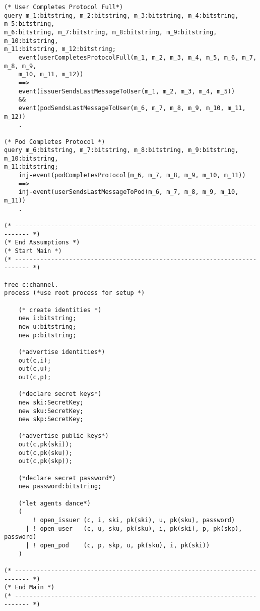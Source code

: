 \begin{Verbatim}[fontsize=\small]
(* User Completes Protocol Full*)
query m_1:bitstring, m_2:bitstring, m_3:bitstring, m_4:bitstring, m_5:bitstring, 
m_6:bitstring, m_7:bitstring, m_8:bitstring, m_9:bitstring, m_10:bitstring,
m_11:bitstring, m_12:bitstring; 
    event(userCompletesProtocolFull(m_1, m_2, m_3, m_4, m_5, m_6, m_7, m_8, m_9, 
    m_10, m_11, m_12))
    ==>
    event(issuerSendsLastMessageToUser(m_1, m_2, m_3, m_4, m_5))
    &&
    event(podSendsLastMessageToUser(m_6, m_7, m_8, m_9, m_10, m_11, m_12))
    .

(* Pod Completes Protocol *)
query m_6:bitstring, m_7:bitstring, m_8:bitstring, m_9:bitstring, m_10:bitstring, 
m_11:bitstring; 
    inj-event(podCompletesProtocol(m_6, m_7, m_8, m_9, m_10, m_11))
    ==>
    inj-event(userSendsLastMessageToPod(m_6, m_7, m_8, m_9, m_10, m_11))
    .

(* -------------------------------------------------------------------------- *)
(* End Assumptions *)
(* Start Main *)
(* -------------------------------------------------------------------------- *)

free c:channel.
process (*use root process for setup *)

    (* create identities *)
    new i:bitstring;
    new u:bitstring;
    new p:bitstring;

    (*advertise identities*)
    out(c,i);
    out(c,u);
    out(c,p);

    (*declare secret keys*)
    new ski:SecretKey;
    new sku:SecretKey;
    new skp:SecretKey;

    (*advertise public keys*)
    out(c,pk(ski));
    out(c,pk(sku));
    out(c,pk(skp));

    (*declare secret password*)
    new password:bitstring;

    (*let agents dance*)
    (
        ! open_issuer (c, i, ski, pk(ski), u, pk(sku), password)
      | ! open_user   (c, u, sku, pk(sku), i, pk(ski), p, pk(skp), password)
      | ! open_pod    (c, p, skp, u, pk(sku), i, pk(ski))
    )

(* -------------------------------------------------------------------------- *)
(* End Main *)
(* -------------------------------------------------------------------------- *)
\end{Verbatim}